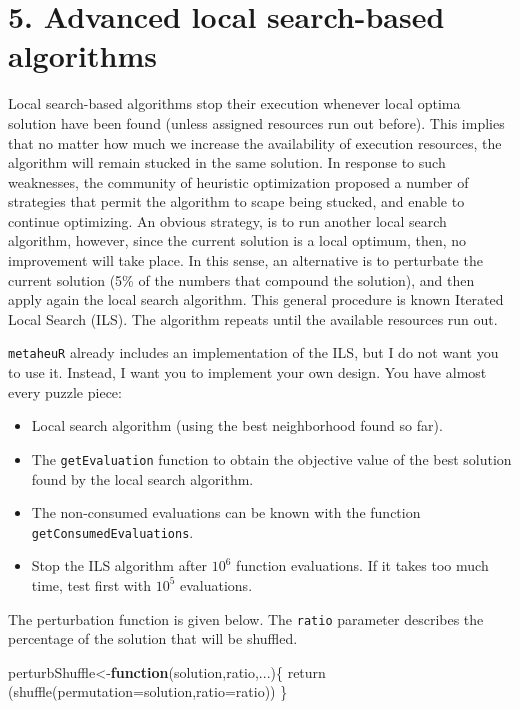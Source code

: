 \documentclass[
]{article}
\newenvironment{Shaded}{\begin{snugshade}}{\end{snugshade}}
\newcommand{\AttributeTok}[1]{\textcolor[rgb]{0.77,0.63,0.00}{#1}}
\newcommand{\ControlFlowTok}[1]{\textcolor[rgb]{0.13,0.29,0.53}{\textbf{#1}}}
\newcommand{\FunctionTok}[1]{\textcolor[rgb]{0.00,0.00,0.00}{#1}}
\newcommand{\NormalTok}[1]{#1}
\newcommand{\OtherTok}[1]{\textcolor[rgb]{0.56,0.35,0.01}{#1}}
\providecommand{\tightlist}{%
  \setlength{\itemsep}{0pt}\setlength{\parskip}{0pt}}
\begin{document}
\hypertarget{advanced-local-search-based-algorithms}{%
\section{5. Advanced local search-based
algorithms}\label{advanced-local-search-based-algorithms}}

Local search-based algorithms stop their execution whenever local optima
solution have been found (unless assigned resources run out before).
This implies that no matter how much we increase the availability of
execution resources, the algorithm will remain stucked in the same
solution. In response to such weaknesses, the community of heuristic
optimization proposed a number of strategies that permit the algorithm
to scape being stucked, and enable to continue optimizing. An obvious
strategy, is to run another local search algorithm, however, since the
current solution is a local optimum, then, no improvement will take
place. In this sense, an alternative is to perturbate the current
solution (5\% of the numbers that compound the solution), and then apply
again the local search algorithm. This general procedure is known
Iterated Local Search (ILS). The algorithm repeats until the available
resources run out.

\texttt{metaheuR} already includes an implementation of the ILS, but I
do not want you to use it. Instead, I want you to implement your own
design. You have almost every puzzle piece:

\begin{itemize}
\tightlist
\item
  Local search algorithm (using the best neighborhood found so far).
\item
  The \texttt{getEvaluation} function to obtain the objective value of
  the best solution found by the local search algorithm.
\item
  The non-consumed evaluations can be known with the function
  \texttt{getConsumedEvaluations}.
\item
  Stop the ILS algorithm after \(10^6\) function evaluations. If it
  takes too much time, test first with \(10^5\) evaluations.
\end{itemize}

The perturbation function is given below. The \texttt{ratio} parameter
describes the percentage of the solution that will be shuffled.

\begin{Shaded}
\begin{Highlighting}[]
\NormalTok{perturbShuffle}\OtherTok{\textless{}{-}}\ControlFlowTok{function}\NormalTok{(solution,ratio,...)\{}
\FunctionTok{return}\NormalTok{ (}\FunctionTok{shuffle}\NormalTok{(}\AttributeTok{permutation=}\NormalTok{solution,}\AttributeTok{ratio=}\NormalTok{ratio))}
\NormalTok{\}}
\end{Highlighting}
\end{Shaded}
\end{document}

